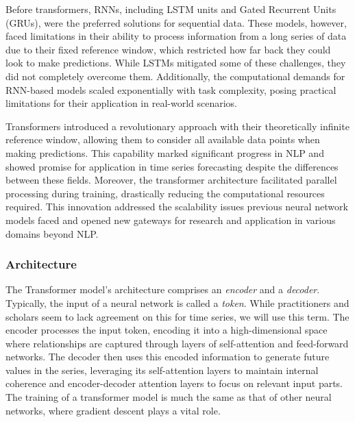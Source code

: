 \documentclass[12pt,a4paper]{article}
\begin{document}
Before transformers, RNNs, including LSTM units and Gated Recurrent Units (GRUs), were the preferred solutions for sequential data. These models, however, faced limitations in their ability to process information from a long series of data due to their fixed reference window, which restricted how far back they could look to make predictions. While LSTMs mitigated some of these challenges, they did not completely overcome them. Additionally, the computational demands for RNN-based models scaled exponentially with task complexity, posing practical limitations for their application in real-world scenarios.

Transformers introduced a revolutionary approach with their theoretically infinite reference window, allowing them to consider all available data points when making predictions. This capability marked significant progress in NLP and showed promise for application in time series forecasting despite the differences between these fields. Moreover, the transformer architecture facilitated parallel processing during training, drastically reducing the computational resources required. This innovation addressed the scalability issues previous neural network models faced and opened new gateways for research and application in various domains beyond NLP. 

\subsubsection{Architecture}
The Transformer model’s architecture comprises an \textit{encoder} and a \textit{decoder}. Typically, the input of a neural network is called a \textit{token}. While practitioners and scholars seem to lack agreement on this for time series, we will use this term. The encoder processes the input token, encoding it into a high-dimensional space where relationships are captured through layers of self-attention and feed-forward networks. The decoder then uses this encoded information to generate future values in the series, leveraging its self-attention layers to maintain internal coherence and encoder-decoder attention layers to focus on relevant input parts. The training of a transformer model is much the same as that of other neural networks, where gradient descent plays a vital role. 
\end{document}
